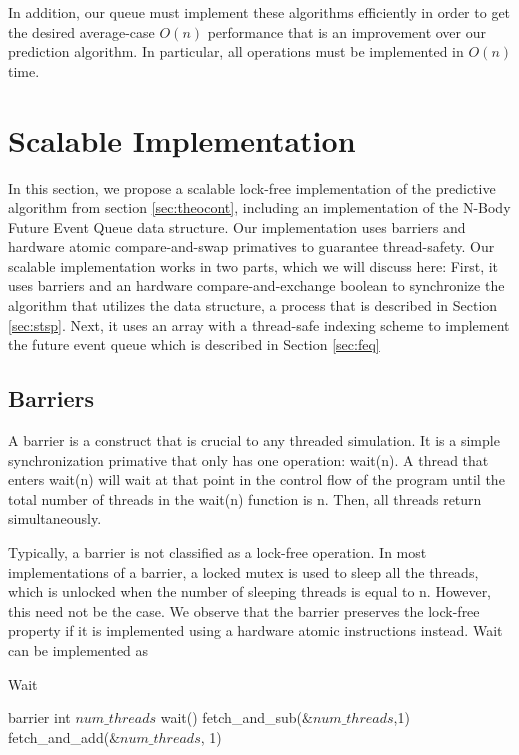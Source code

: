 \documentclass[conference]{IEEEtran}
\begin{document}
In addition, our queue must implement these algorithms efficiently in order to get the desired average-case $O(n)$ performance that is an improvement over our prediction algorithm.  In particular, all operations must be implemented in $O(n)$ time.

\section{Scalable Implementation}
In this section, we propose a scalable lock-free implementation of the predictive algorithm from section \ref{sec:theocont}, including an implementation of the 
N-Body Future Event Queue data structure.  Our implementation uses barriers and hardware atomic compare-and-swap primatives to guarantee thread-safety.  Our scalable implementation
works in two parts, which we will discuss here:  First, it uses barriers and an hardware compare-and-exchange boolean to synchronize the algorithm that utilizes the data structure, 
a process that is described in Section \ref{sec:stsp}.  Next, it uses an array with a thread-safe indexing scheme to implement the future event queue which is described in Section \ref{sec:feq}
\subsection{Barriers}
\label{sec:barrier}
A barrier is a construct that is crucial to any threaded simulation.  It is a simple synchronization primative that only has one operation: wait(n).  
A thread that enters wait(n) will wait at that point in the control flow of the program until the total number of threads in the wait(n) function is n.  Then,
all threads return simultaneously.

Typically, a barrier is not classified as a lock-free operation.  In most implementations of a barrier, a locked mutex is used to sleep all the threads, which is 
unlocked when the number of sleeping threads is equal to n.  However, this need not be the case.  We observe that the barrier preserves the lock-free property if it is implemented
using a hardware atomic instructions instead.  Wait can be implemented as 

\begin{algorithm}
\label{barrier}
\caption{Wait}
\begin{algorithmic}
\STATE barrier
	\STATE int $num\_threads$ 
	\STATE wait()
	\STATE {}
	\STATE fetch\_and\_sub($\&num\_threads$,1)
	\STATE {}
		\STATE {}
		\STATE fetch\_and\_add($\&num\_threads$, 1)
	\ENDWHILE
\end{algorithmic}
\end{algorithm}
\end{document}
